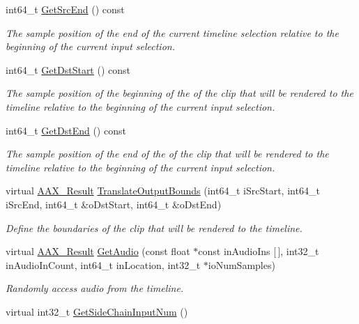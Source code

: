 \begin{DoxyCompactItemize}
int64\+\_\+t \mbox{\hyperlink{a01485_a455276e8b5eb54b8547e7e20fc9b19b8}{Get\+Src\+End}} () const
\begin{DoxyCompactList}\small\item\em The sample position of the end of the current timeline selection relative to the beginning of the current input selection. \end{DoxyCompactList}\item 
int64\+\_\+t \mbox{\hyperlink{a01485_adaec35b42e103cf06f14b1b3e60cb47e}{Get\+Dst\+Start}} () const
\begin{DoxyCompactList}\small\item\em The sample position of the beginning of the of the clip that will be rendered to the timeline relative to the beginning of the current input selection. \end{DoxyCompactList}\item 
int64\+\_\+t \mbox{\hyperlink{a01485_a282b1b5c2be4f4149458f1ec92950a32}{Get\+Dst\+End}} () const
\begin{DoxyCompactList}\small\item\em The sample position of the end of the of the clip that will be rendered to the timeline relative to the beginning of the current input selection. \end{DoxyCompactList}\item 
virtual \mbox{\hyperlink{a00392_a4d8f69a697df7f70c3a8e9b8ee130d2f}{A\+A\+X\+\_\+\+Result}} \mbox{\hyperlink{a01485_a4d793e60071069e6f98c4d841d37ac96}{Translate\+Output\+Bounds}} (int64\+\_\+t i\+Src\+Start, int64\+\_\+t i\+Src\+End, int64\+\_\+t \&o\+Dst\+Start, int64\+\_\+t \&o\+Dst\+End)
\begin{DoxyCompactList}\small\item\em Define the boundaries of the clip that will be rendered to the timeline. \end{DoxyCompactList}\item 
virtual \mbox{\hyperlink{a00392_a4d8f69a697df7f70c3a8e9b8ee130d2f}{A\+A\+X\+\_\+\+Result}} \mbox{\hyperlink{a01485_a6fbc459937cb9df1debbb85134d22111}{Get\+Audio}} (const float $\ast$const in\+Audio\+Ins \mbox{[}$\,$\mbox{]}, int32\+\_\+t in\+Audio\+In\+Count, int64\+\_\+t in\+Location, int32\+\_\+t $\ast$io\+Num\+Samples)
\begin{DoxyCompactList}\small\item\em Randomly access audio from the timeline. \end{DoxyCompactList}\item 
virtual int32\+\_\+t \mbox{\hyperlink{a01485_a55aeb268e1312ddba1989e37cace823f}{Get\+Side\+Chain\+Input\+Num}} ()

\end{DoxyCompactItemize}
